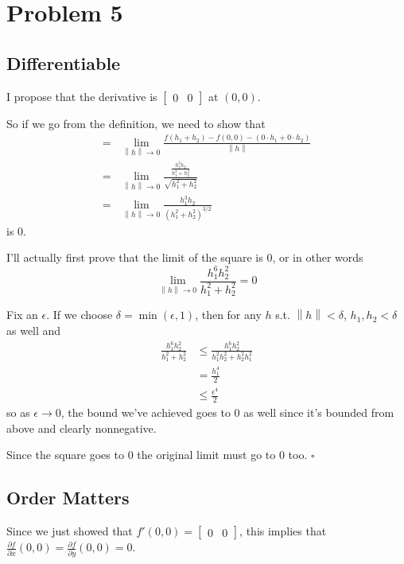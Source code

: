 \documentclass[12pt]{article}
\newcommand{\norm}[1]{\left\lVert#1\right\rVert}
\begin{document}
\pagebreak

\section{Problem 5}

\subsection{Differentiable}

I propose that the derivative is $\begin{bmatrix}0 & 0\end{bmatrix}$ at $(0, 0)$.

So if we go from the definition, we need to show that
\begin{align*}
  ={} & \lim_{\norm{h} \to 0} \frac{f(h_1 + h_2)-f(0, 0) - (0 \cdot h_1 + 0 \cdot h_2)}{\norm{h}} \\
  ={} & \lim_{\norm{h} \to 0} \frac{\frac{h_1^3h_2}{h_1^2+h_2^2}}{\sqrt{h_1^2+h_2^2}}                        \\
  ={} & \lim_{\norm{h} \to 0} \frac{h_1^3h_2}{\left(h_1^2+h_2^2\right)^{3/2}}
\end{align*}
is $0$.

I'll actually first prove that the limit of the square is $0$, or in other words
\[\lim_{\norm{h} \to 0} \frac{h_1^6h_2^2}{h_1^2+h_2^2}=0\]

Fix an $\epsilon$.
If we choose $\delta=\min(\epsilon, 1)$, then for any $h$ s.t. $\norm{h} < \delta$,
$h_1, h_2 < \delta$ as well and
\begin{align*}
  \frac{h_1^6h_2^2}{h_1^2+h_2^2}
   & \le \frac{h_1^6h_2^2}{h_1^2h_2^2+h_2^2h_1^2} \\
   & = \frac{h_1^4}{2}                            \\
   & \le \frac{\epsilon^4}{2}
\end{align*}
so as $\epsilon \to 0$, the bound we've achieved goes to $0$ as well
since it's bounded from above and clearly nonnegative.

Since the square goes to $0$ the original limit must go to $0$ too. $\square$

\pagebreak

\subsection{Order Matters}

Since we just showed that $f'(0, 0)=\begin{bmatrix}0 & 0\end{bmatrix}$,
this implies that $\frac{\partial f}{\partial x}(0, 0) = \frac{\partial f}{\partial y}(0, 0) = 0$.
\end{document}
